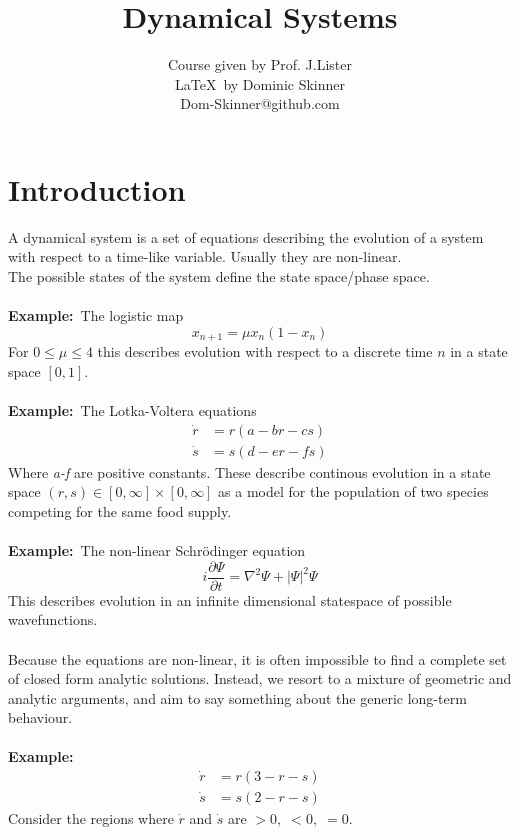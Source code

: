 \documentclass{article}
\newcommand{\example}{\textbf{Example:}}                    %
\begin{document}
\title{Dynamical Systems}
\author{Course given by Prof. J.Lister \\
\LaTeX\  by Dominic Skinner \\
Dom-Skinner@github.com}
\maketitle
\tableofcontents
\section*{Introduction}
A dynamical system is a set of equations describing the evolution of a system
with respect to a time-like variable. Usually they are non-linear.
\\
The possible states of the system define the state space/phase space.
\\
\\
\example\   The logistic map
\[ x_{n+1} = \mu x_n ( 1- x_n) \]
For $ 0 \leq \mu \leq 4 $ this describes evolution with respect to a discrete time 
$n$ in a state space $[0,1]$.
\\
\\
\example\   The Lotka-Voltera equations
\begin{align*}
\dot{r} &= r(a - br -cs) \\
\dot{s} &= s(d - er -fs)
\end{align*}
Where \emph{a-f} are positive constants. These describe continous evolution 
in a state space $(r,s) \in [0 , \infty] \times [0, \infty]$ as a model for 
the population of two species competing for the same food supply.
\\
\\
\example\   The non-linear Schr\"odinger equation
\[ i \frac{\partial \Psi}{ \partial t} = \nabla^2 \Psi + |\Psi|^2 \Psi \]
This describes evolution in an infinite dimensional statespace of possible
wavefunctions.
\\
\\
Because the equations are non-linear, it is often impossible to find a complete
set of closed form analytic solutions. Instead, we resort to a mixture of 
geometric and analytic arguments, and aim to say something about the generic
long-term behaviour.
\\
\\
\example\   
\begin{align*}
\dot{r} &= r(3 - r -s) \\
\dot{s} &= s(2 - r -s)
\end{align*}
Consider the regions where $\dot{r}$ and $\dot{s}$ are $>0, \; <0, \; =0$. 
\end{document}
